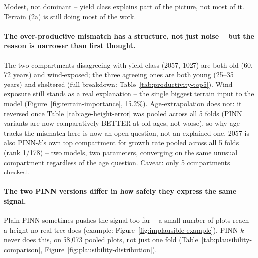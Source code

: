 
Modest, not dominant -- yield class explains part of the picture, not most of it. Terrain
(2a) is still doing most of the work.

\paragraph*{The over-productive mismatch has a structure, not just noise -- but the reason is
narrower than first thought.}
The two compartments disagreeing with yield class (2057, 1027) are both old (60, 72 years) and
wind-exposed; the three agreeing ones are both young (25--35 years) and sheltered (full
breakdown: Table~\ref{tab:productivity-top5}). Wind exposure still stands as a real explanation
-- the single biggest terrain input to the model (Figure~\ref{fig:terrain-importance}, 15.2\%).
Age-extrapolation does not: it reversed once Table~\ref{tab:age-height-error} was pooled across
all 5 folds (PINN variants are now comparatively BETTER at old ages, not worse), so why age
tracks the mismatch here is now an open question, not an explained one. 2057 is also PINN-$k$'s
own top compartment for growth rate pooled across all 5 folds (rank 1/178) -- two models, two
parameters, converging on the same unusual compartment regardless of the age question. Caveat:
only 5 compartments checked.

\paragraph*{The two PINN versions differ in how safely they express the same signal.}
Plain PINN sometimes pushes the signal too far -- a small number of plots reach a height no
real tree does (example: Figure~\ref{fig:implausible-example}). PINN-$k$ never does this, on
58,073 pooled plots, not just one fold (Table~\ref{tab:plausibility-comparison},
Figure~\ref{fig:plausibility-distribution}).

